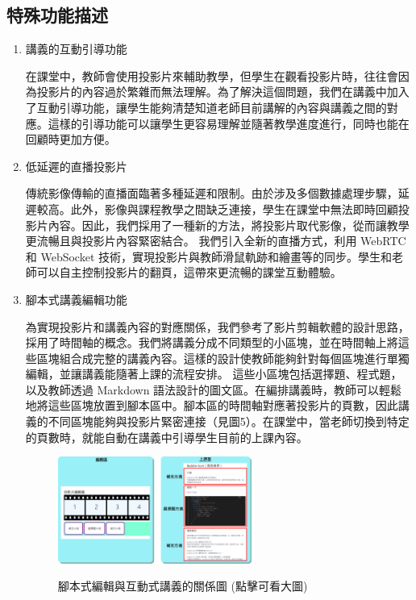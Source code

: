 \documentclass[12pt]{article}
\begin{document}
\subsection{特殊功能描述}
\begin{enumerate}[label=(\arabic*)]
  \setlength{\parindent}{2em}
  \item 講義的互動引導功能
  \par 在課堂中，教師會使用投影片來輔助教學，但學生在觀看投影片時，往往會因為投影片的內容過於繁雜而無法理解。為了解決這個問題，我們在講義中加入了互動引導功能，讓學生能夠清楚知道老師目前講解的內容與講義之間的對應。這樣的引導功能可以讓學生更容易理解並隨著教學進度進行，同時也能在回顧時更加方便。
  \item 低延遲的直播投影片
  \par 傳統影像傳輸的直播面臨著多種延遲和限制。由於涉及多個數據處理步驟，延遲較高。此外，影像與課程教學之間缺乏連接，學生在課堂中無法即時回顧投影片內容。因此，我們採用了一種新的方法，將投影片取代影像，從而讓教學更流暢且與投影片內容緊密結合。
  我們引入全新的直播方式，利用 WebRTC 和 WebSocket 技術，實現投影片與教師滑鼠軌跡和繪畫等的同步。學生和老師可以自主控制投影片的翻頁，這帶來更流暢的課堂互動體驗。
  \item 腳本式講義編輯功能
  \par 為實現投影片和講義內容的對應關係，我們參考了影片剪輯軟體的設計思路，採用了時間軸的概念。我們將講義分成不同類型的小區塊，並在時間軸上將這些區塊組合成完整的講義內容。這樣的設計使教師能夠針對每個區塊進行單獨編輯，並讓講義能隨著上課的流程安排。
  這些小區塊包括選擇題、程式題，以及教師透過 Markdown 語法設計的圖文區。在編排講義時，教師可以輕鬆地將這些區塊放置到腳本區中。腳本區的時間軸對應著投影片的頁數，因此講義的不同區塊能夠與投影片緊密連接（見圖5）。在課堂中，當老師切換到特定的頁數時，就能自動在講義中引導學生目前的上課內容。
  
  \begin{figure}[H]
    \centering
    \href{https://raw.githubusercontent.com/programingtw/proglearn-plan/main/2023全國大專校院智慧創新暨跨域整合創作競賽/img/timezone.png}{
      \includegraphics[width=0.60\textwidth]{./img/timezone.png}
    }
    \caption{腳本式編輯與互動式講義的關係圖 (點擊可看大圖)}
    \label{arc10}
  \end{figure}
  

\end{enumerate}
\end{document}
